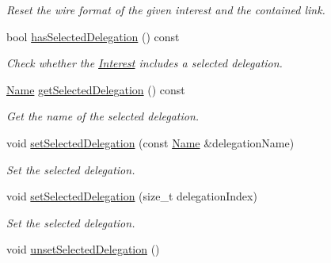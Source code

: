 \begin{DoxyCompactItemize}
\begin{DoxyCompactList}\small\item\em Reset the wire format of the given interest and the contained link. \end{DoxyCompactList}\item 
bool \hyperlink{classndn_1_1Interest_afc729a7b59047847332db20522fc2db4}{has\+Selected\+Delegation} () const
\begin{DoxyCompactList}\small\item\em Check whether the \hyperlink{classndn_1_1Interest}{Interest} includes a selected delegation. \end{DoxyCompactList}\item 
\hyperlink{classndn_1_1Name}{Name} \hyperlink{classndn_1_1Interest_a0dc3605881e3f5076b91e4c8dd7cffe3}{get\+Selected\+Delegation} () const
\begin{DoxyCompactList}\small\item\em Get the name of the selected delegation. \end{DoxyCompactList}\item 
void \hyperlink{classndn_1_1Interest_af9771adace770d69b488bbfb0cb36fc1}{set\+Selected\+Delegation} (const \hyperlink{classndn_1_1Name}{Name} \&delegation\+Name)
\begin{DoxyCompactList}\small\item\em Set the selected delegation. \end{DoxyCompactList}\item 
void \hyperlink{classndn_1_1Interest_a729214bca49b39d6422848fe35591d8d}{set\+Selected\+Delegation} (size\+\_\+t delegation\+Index)
\begin{DoxyCompactList}\small\item\em Set the selected delegation. \end{DoxyCompactList}\item 
void \hyperlink{classndn_1_1Interest_a4633dfece111f38ad8cd4cf257e88acf}{unset\+Selected\+Delegation} ()\hypertarget{classndn_1_1Interest_a4633dfece111f38ad8cd4cf257e88acf}{}\label{classndn_1_1Interest_a4633dfece111f38ad8cd4cf257e88acf}


\end{DoxyCompactItemize}
